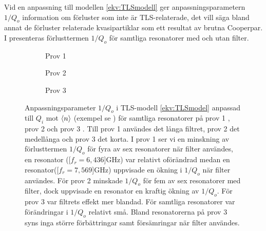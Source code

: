 \documentclass[main.tex]{subfiles}
\begin{document}
Vid en anpassning till modellen \eqref{ekv:TLSmodell} ger anpassningsparametern $1/Q_o$ information om förluster som inte är TLS-relaterade, det vill säga bland annat de förluster relaterade kvasipartiklar som ett resultat av brutna Cooperpar. I  presenteras förlusttermen $1/Q_o$ för samtliga resonatorer med och utan filter.


\begin{figure}[H]
    \centerfloat
    \begin{minipage}{0.85\paperwidth}
    \centerfloat
    \begin{subfigure}{0.33\textwidth}
    \centering
    \setlength{}
    \setlength\figureheight{8em}
    
    \caption{Prov 1}
    \label{fig:Q_other_1}
    \end{subfigure}
    \begin{subfigure}{0.33\textwidth}
    \centering
    \setlength{}
    \setlength\figureheight{8em}
    
    \caption{Prov 2}
    \label{fig:Q_other_2}
    \end{subfigure}
    \hspace{-1em}
    \begin{subfigure}{0.4\paperwidth}
    \centering
    \setlength{}
    \setlength\figureheight{8em}
    
    \caption{Prov 3}
    \label{fig:Q_other_3}
    \end{subfigure}
    \end{minipage}
    \caption{Anpassningsparameter $1/Q_o$ i TLS-modell \eqref{ekv:TLSmodel} anpassad till $Q_i$ mot $\expval{n}$ (exempel se ) för samtliga resonatorer på prov 1 , prov 2  och prov 3 . Till prov 1 användes det långa filtret, prov 2 det medellånga och prov 3 det korta. I prov 1 ser vi en minskning av förlusttermen $1/Q_o$ för fyra av sex resonatorer när filter användes, en resonator (\unit[$f_r=6,436$]{GHz}) var relativt oförändrad medan en resonator(\unit[$f_r=7,569$]{GHz}) uppvisade en ökning i $1/Q_o$ när filter användes. För prov 2 minskade $1/Q_o$ för fem av sex resonatorer med filter, dock uppvisade en resonator en kraftig ökning av $1/Q_o$. För prov 3 var filtrets effekt mer blandad. För samtliga resonatorer var förändringar i $1/Q_o$ relativt små. Bland resonatorerna på prov 3 syns inga större förbättringar samt försämringar när filter användes.}
    \label{fig:Q_other}
\end{figure}
\end{document}
